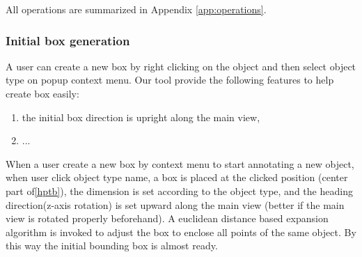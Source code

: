 \documentclass[letterpaper, 10 pt, conference]{ieeeconf}  %
\begin{document}
All operations are summarized in Appendix \ref{app:operations}.


\subsubsection{Initial box generation}

A user can create a new box by right clicking on the object  and then select object type on popup context menu. Our tool provide the following features to help create box easily:

\begin{enumerate}
	\item the initial box direction is upright along the main view, 
	\item ...
\end{enumerate}


When a user create a new box by context menu to start annotating a new object, when user click object type name, a box is placed at the clicked position (center part of\ref{hptb}), the dimension is set according to the object type, and the heading direction(z-axis rotation) is set upward along the main view (better if the main view is rotated properly beforehand).
A euclidean distance based expansion algorithm is invoked to adjust the box to enclose all points of the same object. By this way the initial bounding box is almost ready.
\end{document}
